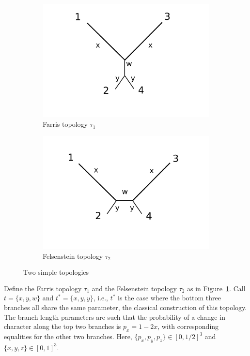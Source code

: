 \documentclass[a4paper]{article}
\begin{document}
\begin{figure}
\centering
\begin{subfigure}{.45\linewidth}
\centering
\includegraphics[width=.95\textwidth]{farris_blank}
\caption[short]{Farris topology $\tau_1$}
\end{subfigure}
\begin{subfigure}{.45\linewidth}
\centering
\includegraphics[width=.95\textwidth]{felsenstein_blank}
\caption[short]{Felsenstein topology $\tau_2$}
\end{subfigure}
\caption{Two simple topologies}
\label{fig:farris-fels-top}
\end{figure}

Define the Farris topology $\tau_1$ and the Felsenstein topology $\tau_2$ as in Figure~\ref{fig:farris-fels-top}.
Call $t=\{x,y,w\}$ and $t^*=\{x,y,y\}$, i.e., $t^*$ is the case where the bottom three branches all share the same parameter, the classical construction of this topology.
The branch length parameters are such that the probability of a change in character along the top two branches is $p_x=1-2x$, with corresponding equalities for the other two branches.
Here, $\{p_x,p_y,p_z\}\in[0,1/2]^3$ and $\{x,y,z\}\in[0,1]^3$.
\end{document}
